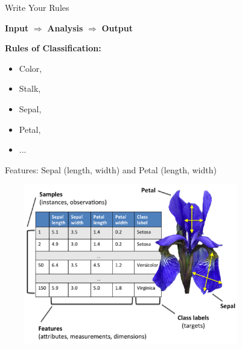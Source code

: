 \documentclass[11pt]{beamer}
\begin{document}
\begin{frame}{Write Your Rules}
\begin{center}
\textbf{Input} $\Rightarrow$ \textbf{Analysis} $\Rightarrow$ \textbf{Output}\newline
\end{center}
\textbf{Rules of Classification:}
   \begin{itemize}
   	\item Color,
   	\item Stalk,
	\item Sepal,
	\item Petal,
	\item ...

\end{itemize}
\end{frame}
\begin{frame}{Features: Sepal (length, width) and Petal (length, width)}
    \begin{center}
	\includegraphics[height=7cm,width=11cm]{8}
	\end{center}
\end{frame}
\end{document}
